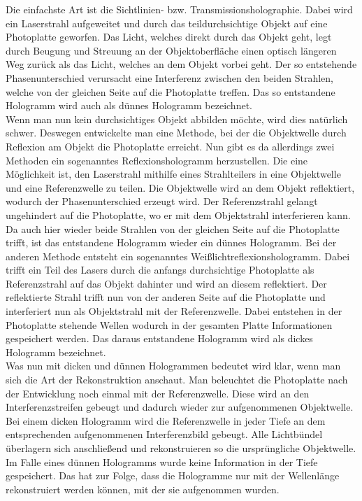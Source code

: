 Die einfachste Art ist die Sichtlinien- bzw. Transmissionsholographie. Dabei wird ein Laserstrahl aufgeweitet und durch das teildurchsichtige Objekt auf eine Photoplatte geworfen. Das Licht, welches direkt durch das Objekt geht, legt durch Beugung und Streuung an der Objektoberfläche einen optisch längeren Weg zurück als das Licht, welches an dem Objekt vorbei geht. Der so entstehende Phasenunterschied verursacht eine Interferenz zwischen den beiden Strahlen, welche von der gleichen Seite auf die Photoplatte treffen. Das so entstandene Hologramm wird auch als dünnes Hologramm bezeichnet.\\

Wenn man nun kein durchsichtiges Objekt abbilden möchte, wird dies natürlich schwer. Deswegen entwickelte man eine Methode, bei der die Objektwelle durch Reflexion am Objekt die Photoplatte erreicht. Nun gibt es da allerdings zwei Methoden ein sogenanntes Reflexionshologramm herzustellen.
Die eine Möglichkeit ist, den Laserstrahl mithilfe eines Strahlteilers in eine Objektwelle und eine Referenzwelle zu teilen. Die Objektwelle wird an dem Objekt reflektiert, wodurch der Phasenunterschied erzeugt wird. Der Referenzstrahl gelangt ungehindert auf die Photoplatte, wo er mit dem Objektstrahl interferieren kann. Da auch hier wieder beide Strahlen von der gleichen Seite auf die Photoplatte trifft, ist das entstandene Hologramm wieder ein dünnes Hologramm.
Bei der anderen Methode entsteht ein sogenanntes Weißlichtreflexionshologramm. Dabei trifft ein Teil des Lasers durch die anfangs durchsichtige Photoplatte als Referenzstrahl auf das Objekt dahinter und wird an diesem reflektiert. Der reflektierte Strahl trifft nun von der anderen Seite auf die Photoplatte und interferiert nun als Objektstrahl mit der Referenzwelle. Dabei entstehen in der Photoplatte stehende Wellen wodurch in der gesamten Platte Informationen gespeichert werden. Das daraus entstandene Hologramm wird als dickes Hologramm bezeichnet.\\

Was nun mit dicken und dünnen Hologrammen bedeutet wird klar, wenn man sich die Art der Rekonstruktion anschaut.
Man beleuchtet die Photoplatte nach der Entwicklung noch einmal mit der Referenzwelle. Diese wird an den Interferenzstreifen gebeugt und dadurch wieder zur aufgenommenen Objektwelle. Bei einem dicken Hologramm wird die Referenzwelle in jeder Tiefe an dem entsprechenden aufgenommenen Interferenzbild gebeugt. Alle Lichtbündel überlagern sich anschließend und rekonstruieren so die ursprüngliche Objektwelle. Im Falle eines dünnen Hologramms wurde keine Information in der Tiefe gespeichert. Das hat zur Folge, dass die Hologramme nur mit der Wellenlänge rekonstruiert werden können, mit der sie aufgenommen wurden.

